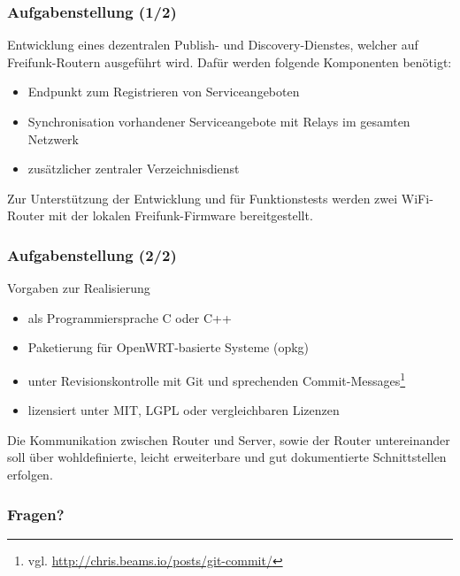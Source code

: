 \documentclass[accentcolor=tud6b,colorbacktitle,inverttitle,landscape,german,presentation,t]{tudbeamer}
\begin{document}
	\begin{frame}
		\frametitle{Aufgabenstellung (1/2)}
			Entwicklung eines dezentralen Publish- und Discovery-Dienstes, welcher auf Freifunk-Routern ausgeführt wird.
			\vfill
			\pause
			Dafür werden folgende Komponenten benötigt:
			\begin{itemize}
			\item Endpunkt zum Registrieren von Serviceangeboten
			\item Synchronisation vorhandener Serviceangebote mit Relays im gesamten Netzwerk
			\item zusätzlicher zentraler Verzeichnisdienst
			\end{itemize}
			\vfill
			\pause
			Zur Unterstützung der Entwicklung und für Funktionstests werden zwei WiFi-Router mit der lokalen Freifunk-Firmware bereitgestellt.
	\end{frame}
	
	\begin{frame}
		\frametitle{Aufgabenstellung (2/2)}
		\vfill
		Vorgaben zur Realisierung
		\begin{itemize}
			\item als Programmiersprache C oder C++
			\item Paketierung für OpenWRT-basierte Systeme (opkg)
			\item unter Revisionskontrolle mit Git und sprechenden Commit-Messages\footnote{vgl. \url{http://chris.beams.io/posts/git-commit/}}
			\item lizensiert unter MIT, LGPL oder vergleichbaren Lizenzen
		\end{itemize}
		\vfill
		\pause
		Die Kommunikation zwischen Router und Server, sowie der Router untereinander soll über wohldefinierte, leicht erweiterbare und gut dokumentierte Schnittstellen erfolgen.
		\vfill
	\end{frame}
	
	\begin{frame}
		\frametitle{Fragen?}
		    \vfill
	\end{frame}
\end{document}

